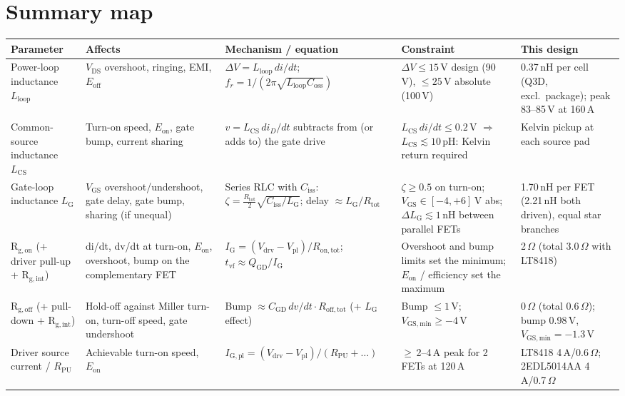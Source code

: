 ﻿\documentclass[10pt,a4paper]{article}
\begin{document}
\section{Summary map}
\renewcommand{\arraystretch}{1.25}
\begin{longtable}{@{}L{2.6cm}L{3.1cm}L{4.4cm}L{3.3cm}L{3.0cm}@{}}
\toprule
Parameter & Affects & Mechanism / equation & Constraint & This design \\\midrule\endhead
Power-loop inductance $L_\mathrm{loop}$ & $V_\mathrm{DS}$ overshoot, ringing, EMI, $E_\mathrm{off}$ & $\Delta V = L_\mathrm{loop}\,di/dt$; $f_r = 1/(2\pi\sqrt{L_\mathrm{loop} C_\mathrm{oss}})$ & $\Delta V\leq15$\,V design (90\,V), $\leq25$\,V absolute (100\,V) & 0.37\,nH per cell (Q3D, excl.\ package); peak 83--85\,V at 160\,A \\
Common-source inductance $L_\mathrm{CS}$ & Turn-on speed, $E_\mathrm{on}$, gate bump, current sharing & $v = L_\mathrm{CS}\,di_D/dt$ subtracts from (or adds to) the gate drive & $L_\mathrm{CS}\,di/dt\leq0.2$\,V $\Rightarrow$ $L_\mathrm{CS}\lesssim10$\,pH: Kelvin return required & Kelvin pickup at each source pad \\
Gate-loop inductance $L_\mathrm{G}$ & $V_\mathrm{GS}$ overshoot/undershoot, gate delay, gate bump, sharing (if unequal) & Series RLC with $C_\mathrm{iss}$: $\zeta=\tfrac{R_\mathrm{tot}}{2}\sqrt{C_\mathrm{iss}/L_\mathrm{G}}$; delay $\approx L_\mathrm{G}/R_\mathrm{tot}$ & $\zeta\geq0.5$ on turn-on; $V_\mathrm{GS}\in[-4,+6]$\,V abs; $\Delta L_\mathrm{G}\lesssim1$\,nH between parallel FETs & 1.70\,nH per FET (2.21\,nH both driven), equal star branches \\
R$_\mathrm{g,on}$ (+ driver pull-up + R$_\mathrm{g,int}$) & di/dt, dv/dt at turn-on, $E_\mathrm{on}$, overshoot, bump on the complementary FET & $I_\mathrm{G}=(V_\mathrm{drv}-V_\mathrm{pl})/R_\mathrm{on,tot}$; $t_\mathrm{vf}\approx Q_\mathrm{GD}/I_\mathrm{G}$ & Overshoot and bump limits set the minimum; $E_\mathrm{on}$ / efficiency set the maximum & 2\,$\Omega$ (total 3.0\,$\Omega$ with LT8418) \\
R$_\mathrm{g,off}$ (+ pull-down + R$_\mathrm{g,int}$) & Hold-off against Miller turn-on, turn-off speed, gate undershoot & Bump $\approx C_\mathrm{GD}\,dv/dt\cdot R_\mathrm{off,tot}$ (+ $L_\mathrm{G}$ effect) & Bump $\leq1$\,V; $V_\mathrm{GS,min}\geq-4$\,V & 0\,$\Omega$ (total 0.6\,$\Omega$); bump 0.98\,V, $V_\mathrm{GS,min}=-1.3$\,V \\
Driver source current / $R_\mathrm{PU}$ & Achievable turn-on speed, $E_\mathrm{on}$ & $I_\mathrm{G,pl}=(V_\mathrm{drv}-V_\mathrm{pl})/(R_\mathrm{PU}+\dots)$ & $\geq$\,2--4\,A peak for 2 FETs at 120\,A & LT8418 4\,A/0.6\,$\Omega$; 2EDL5014AA 4\,A/0.7\,$\Omega$ \\

\end{longtable}
\end{document}
